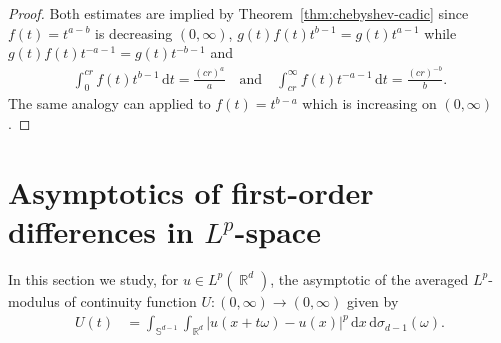 \documentclass[12pt, reqno]{amsart}%
\theoremstyle{plain}  %
\theoremstyle{definition}  %
\theoremstyle{remark}
\numberwithin{equation}{section}
\DeclareMathOperator{\R}{\mathbb{R}}
\renewcommand{\d}{\,\mathrm{d}}
\begin{document}
\begin{proof}
Both estimates are implied by  Theorem~\ref{thm:chebyshev-cadic} since $f(t)=t^{a-b}$ is decreasing  $(0,\infty)$, $g(t) f(t) t^{b-1}= g(t) t^{a-1}$ while $g(t) f(t) t^{-a-1}= g(t) t^{-b-1}$ and
\begin{align*}
\int_0^{c r} f(t)t^{b-1}\d t= \frac{(cr)^{a}}{a}
\quad\text{and}\quad
\int_{c r}^\infty f(t)t^{-a-1}\d t =  \frac{(cr)^{-b}}{b}.
\end{align*}
The same analogy can applied to  $f(t)=t^{b-a}$ which is increasing on $(0,\infty)$.
\end{proof}



\section{Asymptotics of first-order differences in \texorpdfstring{$L^p$}{Lp}-space}\label{sec:Lp-moduos-of-cont}
In this section we  study, for $u\in L^p(\R^d)$, the asymptotic of the averaged $L^p$-modulus of continuity function
$U: (0,\infty)\to  (0,\infty)$ given by
\begin{align*}
U(t) &= \int_{\mathbb{S}^{d-1}} \int_{\R^d} |u(x + t\omega) - u(x)|^p \d x \d\sigma_{d-1}(\omega).
\end{align*}
\end{document}

